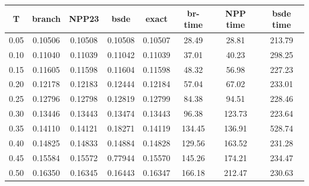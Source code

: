 \begin{tabular}{cccccccc}
\toprule
T & branch & NPP23 & bsde & exact & br-time & NPP time & bsde time \\
\midrule
0.05 & 0.10506 & 0.10508 & 0.10508 & 0.10507 & 28.49 & 28.81 & 213.79 \\
0.10 & 0.11040 & 0.11039 & 0.11042 & 0.11039 & 37.01 & 40.23 & 298.25 \\
0.15 & 0.11605 & 0.11598 & 0.11604 & 0.11598 & 48.32 & 56.98 & 227.23 \\
0.20 & 0.12178 & 0.12183 & 0.12444 & 0.12184 & 57.04 & 67.02 & 233.01 \\
0.25 & 0.12796 & 0.12798 & 0.12819 & 0.12799 & 84.38 & 94.51 & 228.46 \\
0.30 & 0.13446 & 0.13443 & 0.13474 & 0.13443 & 96.38 & 123.73 & 223.64 \\
0.35 & 0.14110 & 0.14121 & 0.18271 & 0.14119 & 134.45 & 136.91 & 528.74 \\
0.40 & 0.14825 & 0.14833 & 0.14884 & 0.14828 & 129.56 & 163.52 & 231.28 \\
0.45 & 0.15584 & 0.15572 & 0.77944 & 0.15570 & 145.26 & 174.21 & 234.47 \\
0.50 & 0.16350 & 0.16345 & 0.16443 & 0.16347 & 166.18 & 212.47 & 230.63 \\
\bottomrule
\end{tabular}
